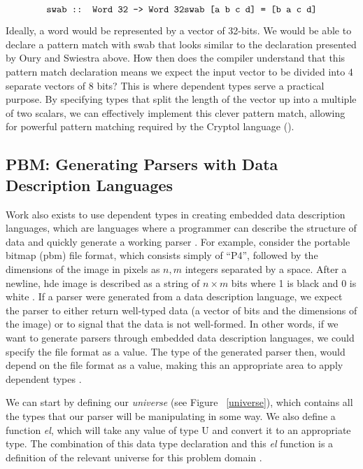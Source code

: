$$
\texttt{swab :: Word 32 -> Word 32} \\
\texttt{swab [a b c d] = [b a c d]} $$

Ideally, a word would be represented by a vector of 32-bits. We would be able to
declare a pattern match with swab that looks similar to the declaration
presented by Oury and Swiestra above. How then does the compiler understand that
this pattern match declaration means we expect the input vector to be divided
into 4 separate vectors of 8 bits? This is where dependent types serve a
practical purpose. By specifying types that split the length of the vector up
into a multiple of two scalars, we can effectively implement this clever pattern
match, allowing for powerful pattern matching required by the Cryptol language
(\cite{power_of_pi}). 

\subsection{PBM: Generating Parsers with Data Description Languages}

Work also exists to use dependent types in creating embedded data description
languages, which are languages where a programmer can describe the structure of
data and quickly generate a working parser \cite{power_of_pi}.  For example,
consider the portable bitmap (pbm) file format, which consists simply of ``P4'',
followed by the dimensions of the image in pixels as $n, m$ integers separated
by a space. After a newline, hde image is described as a string of $n\times m $
bits where 1 is black and 0 is white \cite{pmb_spec}. If a parser were generated
from a data description language, we expect the parser to either return
well-typed data (a vector of bits and the dimensions of the image) or to signal
that the data is not well-formed. In other words, if we want to generate parsers
through embedded data description languages, we could specify the file format as
a value. The type of the generated parser then, would depend on the file format
as a value, making this an appropriate area to apply dependent types
\cite{power_of_pi}. 

We can start by defining our \textit{universe} (see Figure ~\ref{universe}),
which contains all the types that our parser will be manipulating in some way.
We also define a function \textit{el}, which will take any value of type U and
convert it to an appropriate type. The combination of this data type declaration
and this \textit{el} function is a definition of the relevant universe for this
problem domain \cite{power_of_pi}. 

